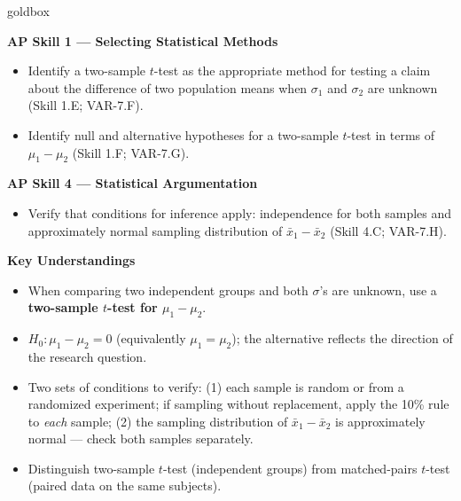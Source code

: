 \documentclass[10pt]{article}
\begin{document}
\renewcommand{\arraystretch}{1.6}
\begin{skillbox}{goldbox}
\begin{minipage}[t]{0.48\linewidth}
    \textbf{AP Skill 1 --- Selecting Statistical Methods}
    \begin{itemize}
        \item Identify a two-sample $t$-test as the appropriate method for testing
              a claim about the difference of two population means when $\sigma_1$
              and $\sigma_2$ are unknown (Skill 1.E; VAR-7.F).
        \item Identify null and alternative hypotheses for a two-sample $t$-test in
              terms of $\mu_1 - \mu_2$ (Skill 1.F; VAR-7.G).
    \end{itemize}
    \textbf{AP Skill 4 --- Statistical Argumentation}
    \begin{itemize}
        \item Verify that conditions for inference apply: independence for both
              samples and approximately normal sampling distribution of
              $\bar x_1 - \bar x_2$ (Skill 4.C; VAR-7.H).
    \end{itemize}
\end{minipage}
\hfill
\begin{minipage}[t]{0.48\linewidth}
    \textbf{Key Understandings}
    \begin{itemize}
        \item When comparing two independent groups and both $\sigma$'s are unknown,
              use a \textbf{two-sample $t$-test for $\mu_1 - \mu_2$}.
        \item $H_0: \mu_1 - \mu_2 = 0$ (equivalently $\mu_1 = \mu_2$); the alternative
              reflects the direction of the research question.
        \item Two sets of conditions to verify: (1) each sample is random or from a
              randomized experiment; if sampling without replacement, apply the 10\%
              rule to \emph{each} sample; (2) the sampling distribution of
              $\bar x_1 - \bar x_2$ is approximately normal --- check both samples
              separately.
        \item Distinguish two-sample $t$-test (independent groups) from matched-pairs
              $t$-test (paired data on the same subjects).
    \end{itemize}
\end{minipage}
\end{skillbox}
\end{document}

